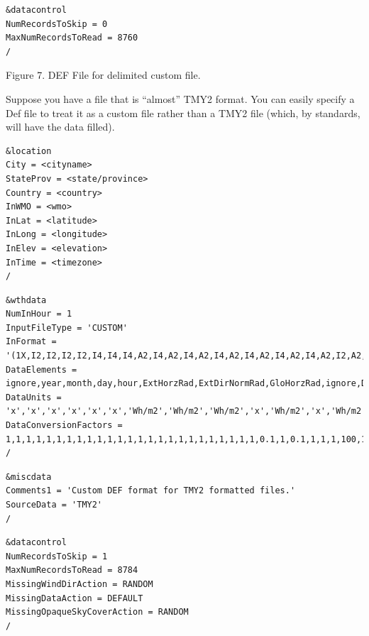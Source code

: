 \begin{lstlisting}
&datacontrol
NumRecordsToSkip = 0
MaxNumRecordsToRead = 8760
/
\end{lstlisting}

Figure 7. DEF File for delimited custom file.

Suppose you have a file that is ``almost'' TMY2 format. You can easily specify a Def file to treat it as a custom file rather than a TMY2 file (which, by standards, will have the data filled).

\begin{lstlisting}
&location
City = <cityname>
StateProv = <state/province>
Country = <country>
InWMO = <wmo>
InLat = <latitude>
InLong = <longitude>
InElev = <elevation>
InTime = <timezone>
/
\end{lstlisting}

\begin{lstlisting}
&wthdata
NumInHour = 1
InputFileType = 'CUSTOM'
InFormat = '(1X,I2,I2,I2,I2,I4,I4,I4,A2,I4,A2,I4,A2,I4,A2,I4,A2,I4,A2,I4,A2,I2,A2,I2,A2,I4,A2,I4,A2,I3,A2,I4,A2,I3,A2,I3,A2,I4,A2,I5,A2,I1,A9,I3,A2,I3,A2,I3,A2,I2,A2)'
DataElements = ignore,year,month,day,hour,ExtHorzRad,ExtDirNormRad,GloHorzRad,ignore,DirNormRad,ignore,DifHorzRad,ignore,GloHorzIllum,ignore,DirNormIllum,ignore,DifHorzIllum,ignore,ZenithLum,ignore,ignore,ignore,ignore,ignore,DryBulb,ignore,DewPoint,ignore,RelHumid,ignore,Pressure,ignore,WindDir,ignore,WindSpd,ignore,Visibility,ignore,CeilHgt,ignore,ObsIndicator,WeatherCodes,PrecWtr,ignore,AerOptDepth,ignore,SnowDepth,ignore,DaysSnow,ignore
DataUnits = 'x','x','x','x','x','x','Wh/m2','Wh/m2','Wh/m2','x','Wh/m2','x','Wh/m2','x','lux','x','lux','x','lux','x','Cd/m2','x','x','x','x','x','C','x','C','x','%','x','x','x','deg','x','m/s','x','x','x','x','x','x','x','x','x','x','x','x','x','x','x'
DataConversionFactors = 1,1,1,1,1,1,1,1,1,1,1,1,1,1,1,1,1,1,1,1,1,1,1,1,1,0.1,1,0.1,1,1,1,100,1,1,1,0.1,1,1,1,1,1,1,1,1,1,1,1,1,1,1,1
/
\end{lstlisting}

\begin{lstlisting}
&miscdata
Comments1 = 'Custom DEF format for TMY2 formatted files.'
SourceData = 'TMY2'
/
\end{lstlisting}

\begin{lstlisting}
&datacontrol
NumRecordsToSkip = 1
MaxNumRecordsToRead = 8784
MissingWindDirAction = RANDOM
MissingDataAction = DEFAULT
MissingOpaqueSkyCoverAction = RANDOM
/
\end{lstlisting}

